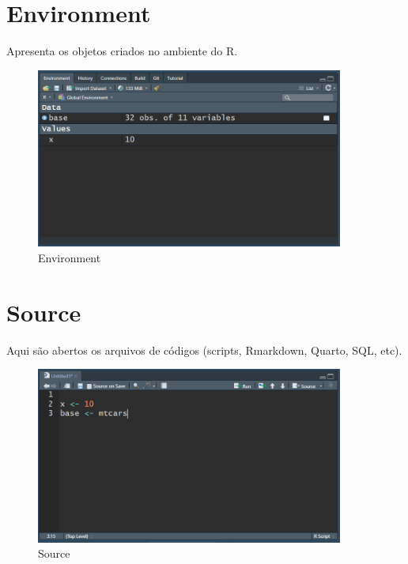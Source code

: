 \documentclass[
  letterpaper,
  DIV=11,
  numbers=noendperiod]{scrreprt}
\begin{document}
\hypertarget{environment}{%
\section{Environment}\label{environment}}

Apresenta os objetos criados no ambiente do R.

\begin{figure}

{\centering \includegraphics[width=0.9\textwidth,height=\textheight]{./images/rstudio/environment.PNG}

}

\caption{\label{fig-rstudio-environment}Environment}

\end{figure}

\hypertarget{source}{%
\section{Source}\label{source}}

Aqui são abertos os arquivos de códigos (scripts, Rmarkdown, Quarto,
SQL, etc).

\begin{figure}

{\centering \includegraphics[width=0.9\textwidth,height=\textheight]{./images/rstudio/source.PNG}

}

\caption{\label{fig-rstudio-source}Source}

\end{figure}
\end{document}
